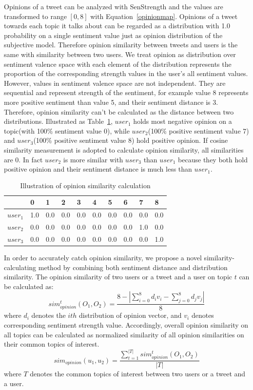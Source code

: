 \documentclass[letterpaper]{article}
\begin{document}
Opinions of a tweet can be analyzed with SenStrength and the values are transformed to range $ \left[ 0,8 \right]  $  with Equation~\ref{opinionmap}.
Opinions of a tweet towards each topic it talks about can be regarded as a distribution with 1.0 probability on a single sentiment value just as opinion distribution of the subjective model. 
Therefore opinion similarity between tweets and users is the same with similarity between two users.   
We treat opinion as distribution over sentiment valence space with each element of the distribution represents the proportion of the corresponding strength values in the user's all sentiment values. 
However, values in sentiment valence space are not independent. 
They are sequential and represent strength of the sentiment, for example value 8 represents more positive sentiment than value 5, and their sentiment distance is 3.
Therefore, opinion similarity can't be calculated as the distance between two distributions.
Illustrated as Table~\ref{tab1}, $ user_{1} $ holds most negative opinion on a topic(with 100\% sentiment value 0), while $ user_{2} $(100\% positive sentiment value 7) and $ user_{3} $(100\% positive sentiment value 8) hold positive opinion.
If cosine similarity measurement is adopted to calculate opinion similarity, all similarities are 0.
In fact $ user_{2} $ is more similar with $ user_{3} $ than $ user_{1} $ because they both hold positive opinion and their sentiment distance is much less than $ user_{1} $. 
\begin{table}[h]
\scriptsize
\centering
\caption{Illustration of opinion similarity calculation}
\label{tab1}
\begin{tabular}{|l|l|l|l|l|l|l|l|l|l|}
\hline
 & 0 & 1& 2 & 3 & 4 & 5 & 6 & 7 & 8 \\
\hline
$user_{1}$ & 1.0 & 0.0 & 0.0 & 0.0 & 0.0 & 0.0 & 0.0 & 0.0 & 0.0 \\
\hline
$user_{2}$ & 0.0 & 0.0 & 0.0 & 0.0 & 0.0 & 0.0 & 0.0 & 1.0 & 0.0 \\
\hline
$user_{3}$ & 0.0 & 0.0 & 0.0 & 0.0 & 0.0 & 0.0 & 0.0 & 0.0 & 1.0 \\
\hline
\end{tabular}
\end{table}  
In order to accurately catch opinion similarity, we propose a novel similarity-calculating method by combining both sentiment distance and distribution similarity.
The opinion similarity of two users or a tweet and a user on topic $ t $ can be calculated as: 
\begin{equation}
sim_{opinion}^{t}(O_{1},O_{2})=\dfrac{8-|\sum_{i=0}^{8}d_{i}v_{i}-\sum_{j=0}^{8}d_{j}v_{j}|}{8}
\end{equation}
where $ d_{i} $ denotes the $ ith $ distribution of opinion vector, and $ v_{i} $ denotes corresponding sentiment strength value.
Accordingly, overall opinion similarity on all topics can be calculated as normalized similarity of all opinion similarities on their common topics of interest. 
\begin{equation}
sim_{opinion}(u_{1},u_{2})=\dfrac{\sum_{t=1}^{|T|}sim_{opinion}^{t}(O_{1},O_{2})}{|T|}
\end{equation}
where $ T $ denotes the common topics of interest between two users or a tweet and a user.
\end{document}
